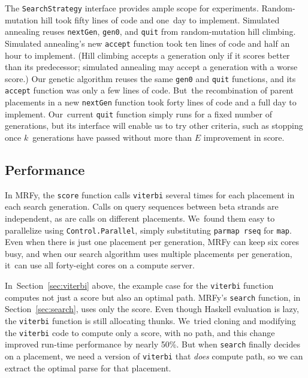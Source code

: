 \documentclass[preprint,nonatbib,blockstyle,nocopyrightspace,times]{sigplanconf}
\newcommand\secref[1]{Section~\ref{sec:#1}}
\newcommand\seclabel[1]{\label{sec:#1}}
\begin{document}
The \texttt{SearchStrategy} interface provides ample scope for
experiments. 
Random-mutation hill took fifty lines of code and one~day to
implement.
Simulated annealing reuses
 \texttt{nextGen}, \texttt{gen0}, and \texttt{quit} 
from random-mutation hill climbing.
Simulated annealing's  new \texttt{accept} function took ten
lines of code and half an hour to implement.
(Hill climbing accepts a generation only if it scores better than its
predecessor;
simulated annealing may accept a generation with a worse score.)
Our genetic algorithm reuses the same
\texttt{gen0} and \texttt{quit} functions, and its \texttt{accept}
function was only a few lines of code.
But~the recombination of parent
placements in a new \texttt{nextGen} function took forty lines of code
and a full day to implement.
Our~current \texttt{quit} function simply runs for a fixed number of
generations, but its interface will enable us to try other criteria,
such as stopping once $k$~generations have passed without more than $E$
improvement in score. 





\subsection{Performance}

\seclabel{perf}

In MRFy, the \texttt{score} function calls \texttt{viterbi} several
 times
for each placement in each search generation.
Calls on query sequences between beta strands are independent,
as are calls on different placements.
We~found them easy to parallelize
using
\texttt{Control.Parallel},
simply substituting
\texttt{parmap rseq} for \texttt{map}.
Even when there is just one placement per generation,
MRFy can keep six cores busy,
and when our search algorithm uses multiple placements per generation,
it~can use all forty-eight cores on a compute server.


In~\secref{viterbi} above, the example case for the \texttt{viterbi}
function computes not just a score but also an optimal path.
MRFy's \texttt{search} function, in \secref{search}, uses only the
score.
Even though Haskell evaluation is lazy, the \texttt{viterbi} function
is still allocating thunks.
We~tried cloning and modifying the \texttt{viterbi} code to compute
only a score, with no path, and this change improved 
run-time performance by nearly 50\%.
But when \texttt{search} finally decides on a placement, we need a
version of \texttt{viterbi} that \emph{does} compute path, so we can
extract the optimal parse for that placement.
\end{document}
